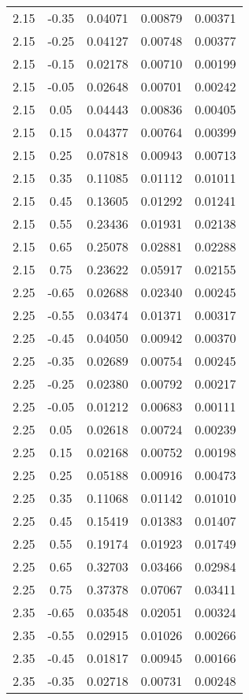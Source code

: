 \begin{longtable}{ccccc}
2.15 & -0.35 & 0.04071 & 0.00879 & 0.00371 \\ 
2.15 & -0.25 & 0.04127 & 0.00748 & 0.00377 \\ 
2.15 & -0.15 & 0.02178 & 0.00710 & 0.00199 \\ 
2.15 & -0.05 & 0.02648 & 0.00701 & 0.00242 \\ 
2.15 & 0.05 & 0.04443 & 0.00836 & 0.00405 \\ 
2.15 & 0.15 & 0.04377 & 0.00764 & 0.00399 \\ 
2.15 & 0.25 & 0.07818 & 0.00943 & 0.00713 \\ 
2.15 & 0.35 & 0.11085 & 0.01112 & 0.01011 \\ 
2.15 & 0.45 & 0.13605 & 0.01292 & 0.01241 \\ 
2.15 & 0.55 & 0.23436 & 0.01931 & 0.02138 \\ 
2.15 & 0.65 & 0.25078 & 0.02881 & 0.02288 \\ 
2.15 & 0.75 & 0.23622 & 0.05917 & 0.02155 \\ \hline
2.25 & -0.65 & 0.02688 & 0.02340 & 0.00245 \\ 
2.25 & -0.55 & 0.03474 & 0.01371 & 0.00317 \\ 
2.25 & -0.45 & 0.04050 & 0.00942 & 0.00370 \\ 
2.25 & -0.35 & 0.02689 & 0.00754 & 0.00245 \\ 
2.25 & -0.25 & 0.02380 & 0.00792 & 0.00217 \\ 
2.25 & -0.05 & 0.01212 & 0.00683 & 0.00111 \\ 
2.25 & 0.05 & 0.02618 & 0.00724 & 0.00239 \\ 
2.25 & 0.15 & 0.02168 & 0.00752 & 0.00198 \\ 
2.25 & 0.25 & 0.05188 & 0.00916 & 0.00473 \\ 
2.25 & 0.35 & 0.11068 & 0.01142 & 0.01010 \\ 
2.25 & 0.45 & 0.15419 & 0.01383 & 0.01407 \\ 
2.25 & 0.55 & 0.19174 & 0.01923 & 0.01749 \\ 
2.25 & 0.65 & 0.32703 & 0.03466 & 0.02984 \\ 
2.25 & 0.75 & 0.37378 & 0.07067 & 0.03411 \\ \hline
2.35 & -0.65 & 0.03548 & 0.02051 & 0.00324 \\ 
2.35 & -0.55 & 0.02915 & 0.01026 & 0.00266 \\ 
2.35 & -0.45 & 0.01817 & 0.00945 & 0.00166 \\ 
2.35 & -0.35 & 0.02718 & 0.00731 & 0.00248 \\ 

\end{longtable}
